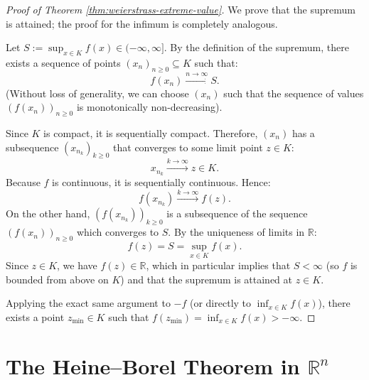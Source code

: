 \begin{content}
\begin{proof}[Proof of Theorem \ref{thm:weierstrass-extreme-value}]
We prove that the supremum is attained; the proof for the infimum is completely analogous.

Let $S := \sup_{x \in K} f(x) \in (-\infty, \infty]$. By the definition of the supremum, there exists a sequence of points $(x_n)_{n \ge 0} \subseteq K$ such that:
\begin{equation}\label{eq:optimizing-sequence}
f(x_n) \xrightarrow{n \to \infty} S.
\end{equation}
(Without loss of generality, we can choose $(x_n)$ such that the sequence of values $(f(x_n))_{n \ge 0}$ is monotonically non-decreasing).

Since $K$ is compact, it is sequentially compact. Therefore, $(x_n)$ has a subsequence $(x_{n_k})_{k \ge 0}$ that converges to some limit point $z \in K$:
\[
x_{n_k} \xrightarrow{k \to \infty} z \in K.
\]
Because $f$ is continuous, it is sequentially continuous. Hence:
\[
f(x_{n_k}) \xrightarrow{k \to \infty} f(z).
\]
On the other hand, $(f(x_{n_k}))_{k \ge 0}$ is a subsequence of the sequence $(f(x_n))_{n \ge 0}$ which converges to $S$. By the uniqueness of limits in $\mathbb{R}$:
\[
f(z) = S = \sup_{x \in K} f(x).
\]
Since $z \in K$, we have $f(z) \in \mathbb{R}$, which in particular implies that $S < \infty$ (so $f$ is bounded from above on $K$) and that the supremum is attained at $z \in K$.

Applying the exact same argument to $-f$ (or directly to $\inf_{x \in K} f(x)$), there exists a point $z_{\min} \in K$ such that $f(z_{\min}) = \inf_{x \in K} f(x) > -\infty$.
\end{proof}
\end{content}

\begin{hidden}
\end{hidden}

\section{The Heine--Borel Theorem in \texorpdfstring{$\mathbb{R}^n$}{R^n}}


